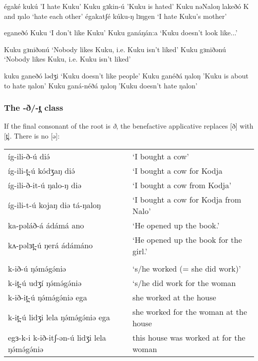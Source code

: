 égaké kukú 'I hate Kuku'
Kuku gɜkin-ú 'Kuku is hated'
Kuku nəNaloŋ lakeðó K and ŋalo `hate each other'
égakatʃé kúku-ŋ lɜŋgen `I hate Kuku's mother'

eganeðó Kuku `I don't like Kuku'
Kuku ganáŋán:a `Kuku doesn't look like...'

Kuku gɜniðənú `Nobody likes Kuku, i.e. Kuku isn't liked'
Kuku gɜniðənú `Nobody likes Kuku, i.e. Kuku isn't liked'

kuku ganeðó lədʒi `Kuku doesn't like people'
Kuku ganéðá ŋaloŋ 'Kuku is about to hate ŋalon'
Kuku ganá-néðá ŋaloŋ 'Kuku doesn't hate ŋalon'




\subsubsection{The -ð/-t̪ class}

If the final consonant of the root is \textit{ð}, the benefactive applicative replaces [ð] with [t̪]. There is no [ə]:\\

\ea \begin{tabular}[t]{ll}
	íg-ili-ð-ú 	diə́		&	‘I bought a cow’\\
	íg-ili-t̪-ú kódʒaŋ diə́ 	&	‘I bought a cow for Kodja\\
	íg-ili-ð-it-ú ŋalo-ŋ diə&	‘I bought a cow from Kodja’\\ %
	íg-ili-t-ú kojaŋ  diə tá-ŋaloŋ &  `I bought a cow for Kodja from Nalo' \\
ka-pəláð-á ádámá ano	& ‘He opened up the book.’\\
kʌ-pəlɜt̪-ú ŋerá ádámáno	& ‘He opened up the book for the girl.’\\
& \\	
	k-ið-ú ŋə́mə́gə́niə			&	‘s/he worked (= she did work)’\\
	k-it̪-ú udʒí ŋə́mə́gə́niə		&	‘s/he did work for the woman\\
	k-ið-it̪-ú ŋə́mə́gə́niə ega	&		she worked at the house\\
	
	k-it̪-ú lidʒi lela ŋə́mə́gə́niə ega	&		she worked for the woman at the house \\

egɜ-k-i k-ið-itʃ-ən-ú lidʒi lela ŋə́mə́gə́niə	&		this house was worked at for the woman \\
\end{tabular}
	\z 

